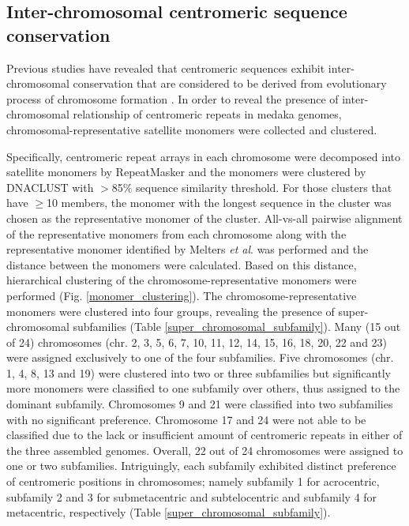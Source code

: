 \subsection*{Inter-chromosomal centromeric sequence conservation}
  Previous studies have revealed that centromeric sequences exhibit inter-chromosomal conservation that are considered to be derived from evolutionary process of chromosome formation \cite{}. In order to reveal the presence of inter-chromosomal relationship of centromeric repeats in medaka genomes, chromosomal-representative satellite monomers were collected and clustered.

  Specifically, centromeric repeat arrays in each chromosome were decomposed into satellite monomers by RepeatMasker and the monomers were clustered by DNACLUST \cite{} with $>$85\% sequence similarity threshold. For those clusters that have $\geq$10 members, the monomer with the longest sequence in the cluster was chosen as the representative monomer of the cluster. All-vs-all pairwise alignment of the representative monomers from each chromosome along with the representative monomer identified by Melters \textit{et al}. was performed and the distance between the monomers were calculated. Based on this distance, hierarchical clustering of the chromosome-representative monomers were performed (Fig. \ref{monomer_clustering}). The chromosome-representative monomers were clustered into four groups, revealing the presence of super-chromosomal subfamilies (Table \ref{super_chromosomal_subfamily}). Many (15 out of 24) chromosomes (chr. 2, 3, 5, 6, 7, 10, 11, 12, 14, 15, 16, 18, 20, 22 and 23) were assigned exclusively to one of the four subfamilies. Five chromosomes (chr. 1, 4, 8, 13 and 19) were clustered into two or three subfamilies but significantly more monomers were classified to one subfamily over others, thus assigned to the dominant subfamily. Chromosomes 9 and 21 were classified into two subfamilies with no significant preference. Chromosome 17 and 24 were not able to be classified due to the lack or insufficient amount of centromeric repeats in either of the three assembled genomes. Overall, 22 out of 24 chromosomes were assigned to one or two subfamilies. Intriguingly, each subfamily exhibited distinct preference of centromeric positions in chromosomes; namely subfamily 1 for acrocentric, subfamily 2 and 3 for submetacentric and subtelocentric and subfamily 4 for metacentric, respectively (Table \ref{super_chromosomal_subfamily}).


